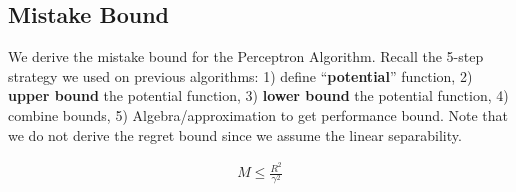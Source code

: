 \documentclass[11pt]{article}
\begin{document}
\subsection{Mistake Bound}
We derive the mistake bound for the Perceptron Algorithm. Recall the 5-step strategy we used on previous algorithms: 1) define ``\textbf{potential}'' function, 2) \textbf{upper bound} the potential function, 3) \textbf{lower bound} the potential function, 4) combine bounds, 5) Algebra/approximation to get performance bound. Note that we do not derive the regret bound since we assume the linear separability.


\begin{align}
    M \leq \frac{R^{2}}{\gamma^{2}}
\end{align}
\end{document}
